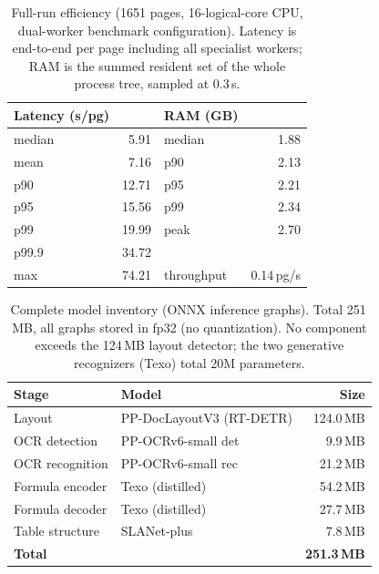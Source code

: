 \begin{table}[t]
\centering
\caption{Full-run efficiency (1651 pages, 16-logical-core CPU, dual-worker benchmark configuration). Latency is end-to-end per page including all specialist workers; RAM is the summed resident set of the whole process tree, sampled at 0.3\,s.}
\label{tab:perf}
\small
\setlength{\tabcolsep}{5pt}
\begin{tabular}{lrlr}
\toprule
Latency (s/pg) & & RAM (GB) & \\
\midrule
median & 5.91 & median & 1.88 \\
mean & 7.16 & p90 & 2.13 \\
p90 & 12.71 & p95 & 2.21 \\
p95 & 15.56 & p99 & 2.34 \\
p99 & 19.99 & peak & 2.70 \\
p99.9 & 34.72 & & \\
max & 74.21 & throughput & 0.14\,pg/s \\
\bottomrule
\end{tabular}
\end{table}

\begin{table}[t]
\centering
\caption{Complete model inventory (ONNX inference graphs). Total 251\,MB, all graphs stored in fp32 (no quantization). No component exceeds the 124\,MB layout detector; the two generative recognizers (Texo) total 20M parameters.}
\label{tab:weights}
\small
\setlength{\tabcolsep}{5pt}
\begin{tabular}{llr}
\toprule
Stage & Model & Size \\
\midrule
Layout & PP-DocLayoutV3 (RT-DETR) & 124.0\,MB \\
OCR detection & PP-OCRv6-small det & 9.9\,MB \\
OCR recognition & PP-OCRv6-small rec & 21.2\,MB \\
Formula encoder & Texo (distilled) & 54.2\,MB \\
Formula decoder & Texo (distilled) & 27.7\,MB \\
Table structure & SLANet-plus & 7.8\,MB \\
\midrule
\multicolumn{2}{l}{\textbf{Total}} & \textbf{251.3\,MB} \\
\bottomrule
\end{tabular}
\end{table}

